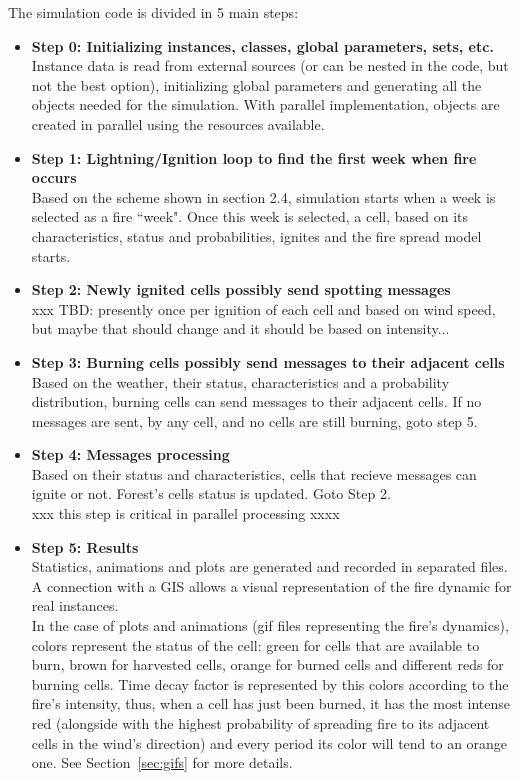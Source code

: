 \documentclass[11pt]{article}
\begin{document}
	The simulation code is divided in 5 main steps:
	\begin{itemize}
		\item \textbf{Step 0: Initializing instances, classes, global parameters, sets, etc.} \\
	Instance data is read from external sources (or can be nested in the code, but not the best option), initializing global parameters and generating all the objects needed for the simulation. With parallel implementation, objects are created in parallel using the resources available. 	
		\item \textbf{Step 1: Lightning/Ignition loop to find the first week when fire occurs} \\
	Based on the scheme shown in section 2.4, simulation starts when a week is selected as a fire ``week". Once this week is selected, a cell,  based on its characteristics, status and probabilities, ignites and the fire spread model starts. \\
		\item \textbf{Step 2: Newly ignited cells possibly send spotting messages} \\
                  xxx TBD: presently once per ignition of each cell and based on wind speed, but maybe that should change and it should be based
                  on intensity...
      \item \textbf{Step 3: Burning cells possibly send messages to their  adjacent cells} \\
	Based on the weather, their status, characteristics and a probability distribution, burning cells can send messages to their adjacent cells. If no messages are sent, by any cell, and no cells are still burning, goto step 5.
		\item \textbf{Step 4: Messages processing}	\\
	Based on their status and characteristics, cells that recieve messages can ignite or not. Forest's cells status is updated. Goto Step 2. \\
		xxx this step is critical in parallel processing xxxx
		\item \textbf{Step 5: Results} \\
	Statistics, animations and plots are generated and recorded in separated files. A connection with a GIS allows a visual representation of the fire dynamic for real instances. \\
	
	In the case of plots and animations (gif files representing the fire's dynamics), colors represent the status of the cell: green for cells that are available to burn, brown for harvested cells, orange for burned cells and different reds for burning cells. Time decay factor is represented by this colors according to the fire's intensity, thus, when a cell has just been burned, it has the most intense red (alongside with the highest probability of spreading fire to its adjacent cells in the wind's direction) and every period its color will tend to an orange one. See
        Section~\ref{sec:gifs} for more details. 
	\end{itemize}
\end{document}
